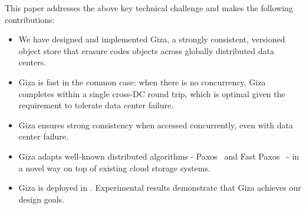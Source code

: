 This paper addresses the above key technical challenge and makes the following contributions:
\begin{itemize}
    \item We have designed and implemented Giza, a strongly consistent,
      versioned object store that erasure codes objects across globally
      distributed data centers.
    \item Giza is fast in the common case: when there is no concurrency, Giza
      completes within a single cross-DC round trip, which is optimal given the
      requirement to tolerate data center failure.
    \item Giza ensures strong consistency when accessed concurrently, even with data center
      failure.
    \item Giza adapts well-known distributed algorithms - Paxos~\cite{lamport01paxos}
      and Fast Paxos~\cite{lamport05fast} - in a novel way on top of existing cloud storage systems.
    \item Giza is deployed in \deployment. Experimental results demonstrate
      that Giza achieves our design goals. %
\end{itemize}

